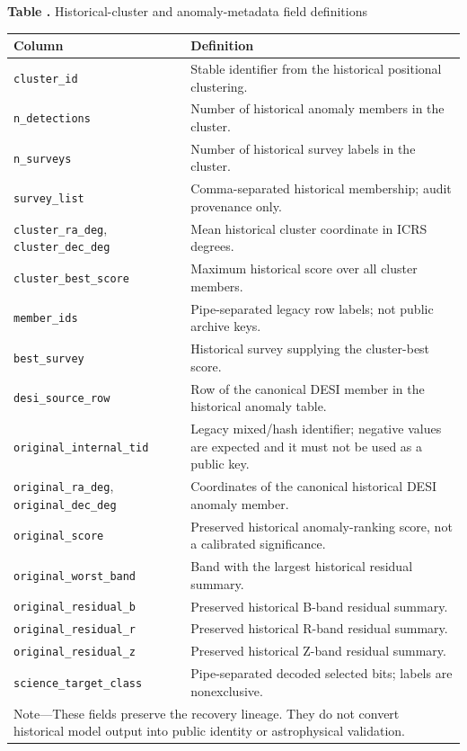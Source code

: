 \documentclass[twocolumn,linenumbers]{aastex702}
\begin{document}
\clearpage
{}\label{tab:history-fields}
\begin{center}
\textbf{Table \thetable.} Historical-cluster and anomaly-metadata field definitions

\smallskip
\scriptsize
\begin{tabular}{p{}p{}}
\toprule
Column & Definition \\
\midrule
\texttt{cluster\_id} & Stable identifier from the historical positional clustering. \\
\texttt{n\_detections} & Number of historical anomaly members in the cluster. \\
\texttt{n\_surveys} & Number of historical survey labels in the cluster. \\
\texttt{survey\_list} & Comma-separated historical membership; audit provenance only. \\
\texttt{cluster\_ra\_deg}, \texttt{cluster\_dec\_deg} & Mean historical cluster coordinate in ICRS degrees. \\
\texttt{cluster\_best\_score} & Maximum historical score over all cluster members. \\
\texttt{member\_ids} & Pipe-separated legacy row labels; not public archive keys. \\
\texttt{best\_survey} & Historical survey supplying the cluster-best score. \\
\texttt{desi\_source\_row} & Row of the canonical DESI member in the historical anomaly table. \\
\texttt{original\_internal\_tid} & Legacy mixed/hash identifier; negative values are expected and it must not be used as a public key. \\
\texttt{original\_ra\_deg}, \texttt{original\_dec\_deg} & Coordinates of the canonical historical DESI anomaly member. \\
\texttt{original\_score} & Preserved historical anomaly-ranking score, not a calibrated significance. \\
\texttt{original\_worst\_band} & Band with the largest historical residual summary. \\
\texttt{original\_residual\_b} & Preserved historical B-band residual summary. \\
\texttt{original\_residual\_r} & Preserved historical R-band residual summary. \\
\texttt{original\_residual\_z} & Preserved historical Z-band residual summary. \\
\texttt{science\_target\_class} & Pipe-separated decoded selected bits; labels are nonexclusive. \\
\bottomrule
\multicolumn{2}{p{0.93\textwidth}}{\footnotesize Note---These fields preserve the recovery
lineage. They do not convert historical model output into public identity or astrophysical
validation.}\\
\end{tabular}
\end{center}
\end{document}
